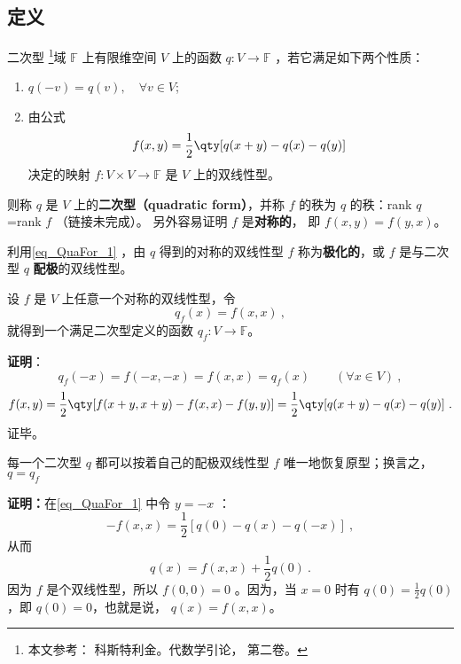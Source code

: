 
\subsection{定义}
\begin{definition}{二次型}\label{def_QuaFor_2}
\footnote{本文参考： 科斯特利金。代数学引论， 第二卷。}域 $\mathbb{F}$ 上有限维空间 $V$ 上的函数 $q:V\rightarrow\mathbb{F}$ ，若它满足如下两个性质：
\begin{enumerate}
\item $q(-{v})=q( v),\quad \forall v\in V$;
\item 由公式
\begin{equation}\label{eq_QuaFor_1}
f(x, y)=\frac{1}{2}\qty[q(x+ y)-q(x)-q(y)]~
\end{equation}
决定的映射 $f:V\times V\rightarrow\mathbb{F}$ 是 $V$ 上的双线性型。
\end{enumerate}
则称 $q$ 是 $V$ 上的\textbf{二次型（quadratic form）}，并称 $f$ 的秩为 $q$ 的秩：rank $q$=rank $f$ （链接未完成）。 另外容易证明 $f$ 是\textbf{对称的}， 即 $f(x,y) = f(y,x)$。
\end{definition}
利用\autoref{eq_QuaFor_1} ，由 $q$ 得到的对称的双线性型 $f$ 称为\textbf{极化的}，或 $f$ 是与二次型 $q$ \textbf{配极}的双线性型。
\begin{example}{}
设 $f$ 是 $V$ 上任意一个对称的双线性型，令
\begin{equation}
q_f( x)=f( x, x)~,
\end{equation}
就得到一个满足二次型定义的函数 $q_f:V\rightarrow\mathbb{F}$。

\textbf{证明}：
\begin{equation}
q_f(-{x})=f(-{x},-{x})=f({x},{x})=q_f({x}) \qquad (\forall x\in V)~,
\end{equation}
\begin{equation}
f(x, y)=\frac{1}{2}\qty[f( x+ y, x+ y)-f( x, x)-f( y, y)]
=\frac{1}{2}\qty[q(x+ y)-q(x)-q(y)]~.
\end{equation}
证毕。
\end{example}

\begin{theorem}{}\label{the_QuaFor_1}
每一个二次型 $q$ 都可以按着自己的配极双线性型 $f$ 唯一地恢复原型；换言之， $q=q_f$
\end{theorem}
\textbf{证明：}在\autoref{eq_QuaFor_1} 中令 $y=-x$ ：
\begin{equation}
-f(x,x)=\frac{1}{2}[q(0)-q(x)-q(-x)]~,
\end{equation}
从而
\begin{equation}
q(x)=f(x,x)+\frac{1}{2}q(0)~.
\end{equation}
因为 $f$ 是个双线性型，所以 $f(0,0)=0$ 。因为，当 $x=0$ 时有 $q(0)=\frac{1}{2}q(0)$ ，即 $q(0)=0$，也就是说， $q(x)=f(x,x)$。

